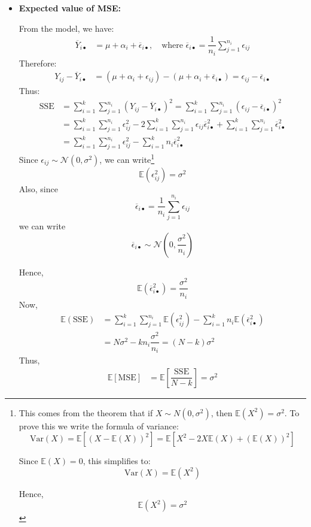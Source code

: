 \documentclass[twoside]{book}
\begin{document}
\begin{itemize}
\item \textbf{Expected value of MSE:}

\bigskip
From the model, we have:
\begin{align*}
\overline{Y}_{i\bullet} &= \mu + \alpha_i + \overline{\epsilon}_{i\bullet}, \quad \text{where } \overline{\epsilon}_{i\bullet} = \dfrac{1}{n_i}\sum_{j=1}^{n_i} \epsilon_{ij}
\end{align*}
Therefore:
\begin{align*}
Y_{ij} - \overline{Y}_{i\bullet} &= (\mu + \alpha_i + \epsilon_{ij}) - (\mu + \alpha_i + \overline{\epsilon}_{i\bullet}) = \epsilon_{ij} - \overline{\epsilon}_{i\bullet}
\end{align*}
Thus:
\begin{align*}
\text{SSE} &= \sum_{i=1}^k \sum_{j=1}^{n_i}(Y_{ij} - \overline{Y}_{i\bullet})^2 = \sum_{i=1}^k \sum_{j=1}^{n_i}(\epsilon_{ij} - \overline{\epsilon}_{i\bullet})^2 \\
&=\sum_{i=1}^k \sum_{j=1}^{n_i}\epsilon_{ij}^2 - 2\sum_{i=1}^k \sum_{j=1}^{n_i}\epsilon_{ij}\overline{\epsilon}_{i\bullet}^2 + \sum_{i=1}^k \sum_{j=1}^{n_i}\overline{\epsilon}_{i\bullet}^2 \\
&=\sum_{i=1}^k \sum_{j=1}^{n_i}\epsilon_{ij}^2-\sum_{i=1}^k {n_i}\overline{\epsilon}_{i\bullet}^2
\end{align*}
Since $\epsilon_{ij} \sim \mathcal{N}(0, \sigma^2)$, we can write\footnote{This comes from the theorem that if \( X \sim N(0, \sigma^2) \), then $\mathbb{E}(X^2) = \sigma^2$. To prove this we write the formula of variance:
\[
\mathrm{Var}(X) = \mathbb{E}[(X - \mathbb{E}(X))^2] = \mathbb{E}[X^2 - 2X\mathbb{E}(X) + (\mathbb{E}(X))^2]
\]

\noindent Since \( \mathbb{E}(X) = 0 \), this simplifies to:
\[
\mathrm{Var}(X) = \mathbb{E}(X^2)
\]

\noindent Hence,
\[
\mathbb{E}(X^2) = \sigma^2
\]
}
$$\mathbb{E}(\epsilon_{ij}^2) = \sigma^2$$
Also, since
$$\overline{\epsilon}_{i\bullet} = \dfrac{1}{n_i}\sum_{j=1}^{n_i}\epsilon_{ij}$$
we can write
$$\overline{\epsilon}_{i\bullet} \sim \mathcal{N}\left( 0, \dfrac{\sigma^2}{n_i}\right) $$

Hence,
$$\mathbb{E}(\overline{\epsilon}_{i\bullet}^2) = \dfrac{\sigma^2}{n_i}$$
Now,
\begin{align*}
\mathbb{E}(\text{SSE}) &= \sum_{i=1}^k \sum_{j=1}^{n_i}\mathbb{E}\left( \epsilon_{ij}^2\right) -\sum_{i=1}^k {n_i}\mathbb{E}\left( \overline{\epsilon}_{i\bullet}^2\right) \\
&=N\sigma^2 - kn_i\dfrac{\sigma^2}{n_i} = (N-k)\sigma^2
\end{align*}
Thus,
\begin{align*}
\mathbb{E}[\text{MSE}] &= \mathbb{E}\left[\dfrac{\text{SSE}}{N-k}\right] = \sigma^2
\end{align*}


\end{itemize}
\end{document}
